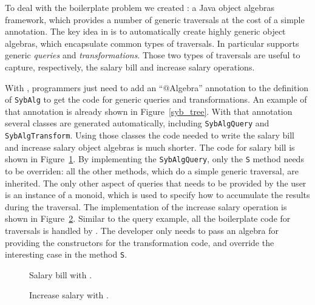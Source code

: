 To deal with the boilerplate problem we created \Name: a Java object
algebras framework, which provides a number of generic traversals at
the cost of a simple annotation. The key idea in \name is to
automatically create highly generic object algebras, which encapsulate
common types of traversals. In particular \name supports generic
\emph{queries} and \emph{transformations}. Those two types of
traversals are useful to capture, respectively, the salary bill and
increase salary operations.

With \Name, programmers just need to add an ``$@$Algebra'' annotation
to the definition of \lstinline{SybAlg} to get the code for generic
queries and transformations. An example of that annotation is already
shown in Figure~\ref{syb_tree}. With that annotation several classes
are generated automatically, including \lstinline{SybAlgQuery} and
\lstinline{SybAlgTransform}. Using those classes the code needed to
write the salary bill and increase salary object algebras is much
shorter. The code for salary bill is shown in
Figure~\ref{query_with_oaframework}. By implementing the
\lstinline{SybAlgQuery}, only the \lstinline{S} method needs to be
overriden: all the other methods, which do a simple generic traversal,
are inherited. The only other aspect of queries that needs to be
provided by the user is an instance of a monoid, which is used to
specify how to accumulate the results during the traversal. The
implementation of the increase salary operation is shown in
Figure~\ref{transform_with_oaframework}. Similar to the query example,
all the boilerplate code for traversals is handled by \Name. The
developer only needs to pass an algebra for providing the constructors
for the transformation code, and override the interesting case in the
method \lstinline{S}.

\begin{figure}[tb]
\vspace{-.1in}
\caption{Salary bill with \Name.}
\label{query_with_oaframework}
\end{figure}

\begin{figure}[tb]
\vspace{-.1in}
\caption{Increase salary with \Name.}
\label{transform_with_oaframework}
\end{figure}

